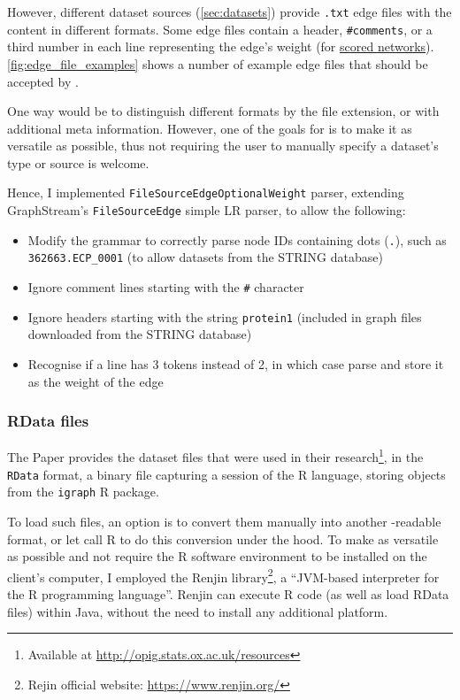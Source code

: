 However, different dataset sources (\autoref{sec:datasets}) provide \texttt{.txt} edge files with the content in different formats.
Some edge files contain a header, \texttt{\#comments}, or a third number in each line representing the edge's weight (for \hyperref[sec:scored_networks]{scored networks}).
\autoref{fig:edge_file_examples} shows a number of example edge files that should be accepted by \graffs.



One way would be to distinguish different formats by the file extension, or with additional meta information.
However, one of the goals for \graffs is to make it as versatile as possible, thus not requiring the user to manually specify a dataset's type or source is welcome.

Hence, I implemented \texttt{FileSourceEdgeOptionalWeight} parser, extending GraphStream's \texttt{FileSourceEdge} simple LR parser, to allow the following:
\begin{itemize}[topsep=5pt]
    \item Modify the grammar to correctly parse node IDs containing dots (\texttt{.}), such as \texttt{362663.ECP\_0001} (to allow datasets from the STRING database)
    \item Ignore comment lines starting with the \texttt{\#} character
    \item Ignore headers starting with the string \texttt{protein1} (included in graph files downloaded from the STRING database)
    \item Recognise if a line has 3 tokens instead of 2, in which case parse and store it as the weight of the edge
\end{itemize}

\subsubsection{RData files}\label{sec:rdata_files}

The Paper\cite{Bozhilova2019} provides the dataset files that were used in their research\footnote{Available at \url{http://opig.stats.ox.ac.uk/resources}}, in the \texttt{RData} format, a binary file capturing a session of the R language, storing objects from the \texttt{igraph} R package.

To load such files, an option is to convert them manually into another \graffs-readable format, or let \graffs call R to do this conversion under the hood.
To make \graffs as versatile as possible and not require the R software environment to be installed on the client's computer, I employed the Renjin library\footnote{Rejin official website: \url{https://www.renjin.org/}}, a \enquote{JVM-based interpreter for the R programming language}.
Renjin can execute R code (as well as load RData files) within Java, without the need to install any additional platform.

